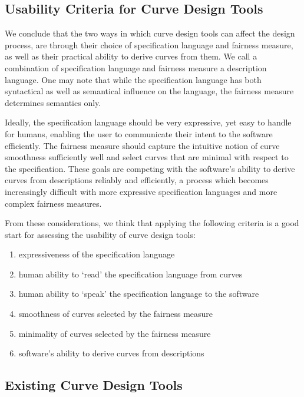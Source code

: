 \documentclass[a4paper]{article}
\begin{document}
		\subsection{Usability Criteria for Curve Design Tools}
		\label{section:usability_criteria_curve_design_tools}

			We conclude that the two ways in which curve design tools can affect the design process, are through their choice of specification language and fairness measure, as well as their practical ability to derive curves from them. We call a combination of specification language and fairness measure a description language. One may note that while the specification language has both syntactical as well as semantical influence on the language, the fairness measure determines semantics only.

			Ideally, the specification language should be very expressive, yet easy to handle for humans, enabling the user to communicate their intent to the software efficiently. The fairness measure should capture the intuitive notion of curve smoothness sufficiently well and select curves that are minimal with respect to the specification. These goals are competing with the software's ability to derive curves from descriptions reliably and efficiently, a process which becomes increasingly difficult with more expressive specification languages and more complex fairness measures.

			From these considerations, we think that applying the following criteria is a good start for assessing the usability of curve design tools:
			\begin{enumerate}
				\item expressiveness of the specification language
				\item human ability to `read' the specification language from curves
				\item human ability to `speak' the specification language to the software
				\item smoothness of curves selected by the fairness measure
				\item minimality of curves selected by the fairness measure
				\item software's ability to derive curves from descriptions
			\end{enumerate}

		\subsection{Existing Curve Design Tools}
		\label{section:existing_curve_design_tools}
\end{document}
